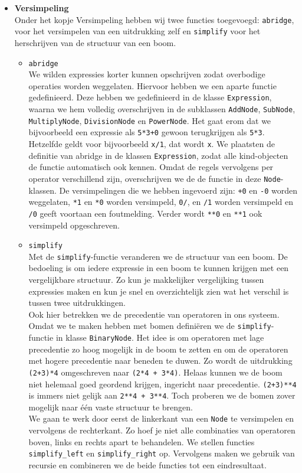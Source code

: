 \documentclass[12pt]{article}
\begin{document}
\begin{itemize}
\item \textbf{Versimpeling}\\
Onder het kopje Versimpeling hebben wij twee functies toegevoegd: \texttt{abridge}, voor het versimpelen van een uitdrukking zelf en \texttt{simplify} voor het herschrijven van de structuur van een boom.
\begin{itemize}
\item \texttt{abridge} \\
We wilden expressies korter kunnen opschrijven zodat overbodige operaties worden weggelaten. Hiervoor hebben we een aparte functie gedefinieerd. Deze hebben we gedefinieerd in de klasse \texttt{Expression}, waarna we hem volledig overschrijven in de  subklassen \texttt{AddNode}, \texttt{SubNode}, \texttt{MultiplyNode}, \texttt{DivisionNode} en \texttt{PowerNode}. Het gaat erom dat we bijvoorbeeld een expressie als \texttt{5*3+0} gewoon terugkrijgen als \texttt{5*3}. Hetzelfde geldt voor bijvoorbeeld \texttt{x/1}, dat wordt \texttt{x}. 
We plaatsten de definitie van abridge in de klassen \texttt{Expression}, zodat alle kind-objecten de functie automatisch ook kennen. Omdat de regels vervolgens per operator verschillend zijn, overschrijven we de de functie in deze \texttt{Node}-klassen. De versimpelingen die we hebben ingevoerd zijn: \texttt{+0} en \texttt{-0} worden weggelaten, \texttt{*1} en \texttt{*0} worden versimpeld, \texttt{0/}, en \texttt{/1} worden versimpeld en \texttt{/0} geeft voortaan een foutmelding. Verder wordt \texttt{**0} en \texttt{**1} ook versimpeld opgeschreven. \\ 
\item \texttt{simplify} \\
Met de \texttt{simplify}-functie veranderen we de structuur van een boom. De bedoeling is om iedere expressie in een boom te kunnen krijgen met een vergelijkbare structuur. Zo kun je makkelijker vergelijking tussen expressies maken en kun je snel en overzichtelijk zien wat het verschil is tussen twee uitdrukkingen. \\ \newline
Ook hier betrekken we de precedentie van operatoren in ons systeem. Omdat we te maken hebben met bomen defini\"eren we de \texttt{simplify}-functie in klasse \texttt{BinaryNode}. Het idee is om operatoren met lage precedentie zo hoog mogelijk in de boom te zetten en om de operatoren met hogere precedentie naar beneden te duwen. Zo wordt  de uitdrukking \texttt{(2+3)*4} omgeschreven naar \texttt{(2*4 + 3*4)}. Helaas kunnen we de boom niet helemaal goed geordend krijgen, ingericht naar precedentie. \texttt{(2+3)**4} is immers niet gelijk aan \texttt{2**4 + 3**4}. Toch proberen we de  bomen zover mogelijk naar \'e\'en vaste structuur te brengen. \\ \newline
We gaan te werk door eerst de linkerkant van een \texttt{Node} te versimpelen en vervolgens de rechterkant. Zo hoef je niet alle combinaties van operatoren boven, links en rechts apart te behandelen. We stellen functies \texttt{simplify\_left} en \texttt{simplify\_right} op. Vervolgens maken we gebruik van recursie en combineren we de beide functies tot een eindresultaat. 
\end{itemize}


\end{itemize}
\end{document}
